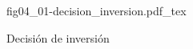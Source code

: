 \begin{figure}[h]
\centering
\def\svgwidth{0.5\textwidth}
{fig04_01-decision_inversion.pdf_tex}
\caption{Decisión de inversión}
\label{fig04_01-decision_inversion}
\end{figure}